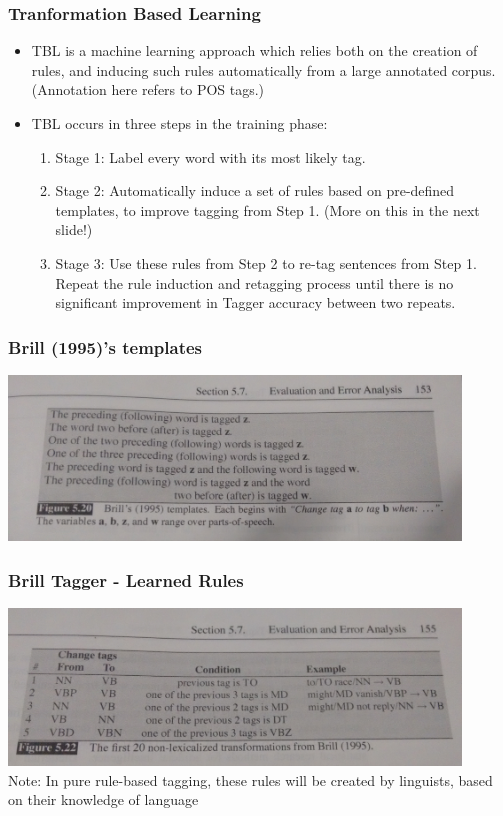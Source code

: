 \documentclass{beamer}
\begin{document}
\begin{frame}
\frametitle{Tranformation Based Learning}
\begin{itemize}
\item TBL is a machine learning approach which relies both on the creation of rules, and inducing such rules automatically from a large annotated corpus.
\\ (Annotation here refers to POS tags.)
\item TBL occurs in three steps in the training phase:
\begin{enumerate}
\item Stage 1: Label every word with its most likely tag.
\item Stage 2: Automatically induce a set of rules based on pre-defined templates, to improve tagging from Step 1. (More on this in the next slide!)
\item Stage 3: Use these rules from Step 2 to re-tag sentences from Step 1. Repeat the rule induction and retagging process until there is no significant improvement in Tagger accuracy between two repeats.
\end{enumerate}
\end{itemize}
\end{frame}

\begin{frame}
\frametitle{Brill (1995)'s templates}
\includegraphics[width=0.9\textwidth]{Brill-1.jpg}
\end{frame}

\begin{frame}
\frametitle{Brill Tagger - Learned Rules}
\includegraphics[width=0.9\textwidth]{Brill-3.jpg} \\ Note: In pure rule-based tagging, these rules will be created by linguists, based on their knowledge of language
\end{frame}
\end{document}
